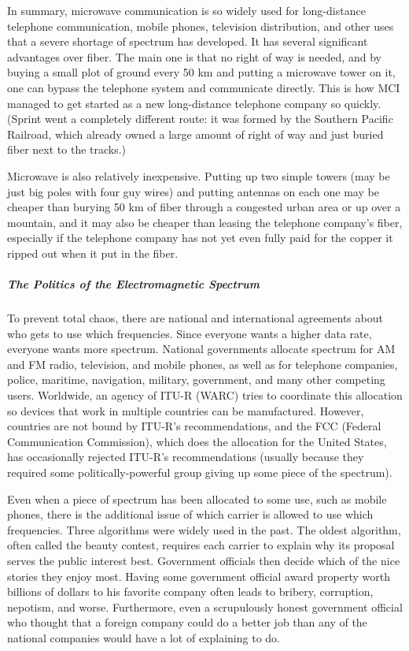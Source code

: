 \documentclass[b5paper,11pt]{memoir}
\begin{document}
In summary, microwave communication is so widely used for long-distance
telephone communication, mobile phones, television distribution, and
other uses that a severe shortage of spectrum has developed. It has
several significant advantages over fiber. The main one is that no right
of way is needed, and by buying a small plot of ground every 50 km and
putting a microwave tower on it, one can bypass the telephone system and
communicate directly. This is how MCI managed to get started as a new
long-distance telephone company so quickly. (Sprint went a completely
different route: it was formed by the Southern Pacific Railroad, which
already owned a large amount of right of way and just buried fiber next
to the tracks.)

Microwave is also relatively inexpensive. Putting up two simple towers
(may be just big poles with four guy wires) and putting antennas on each
one may be cheaper than burying 50 km of fiber through a congested urban
area or up over a mountain, and it may also be cheaper than leasing the
telephone company's fiber, especially if the telephone company has not
yet even fully paid for the copper it ripped out when it put in the
fiber.

\protect\hypertarget{0130661023_ch02lev1sec3.htmlux5cux23ch02lev3sec5}{}{}

\subparagraph{The Politics of the Electromagnetic Spectrum}

To prevent total chaos, there are national and international agreements
about who gets to use which frequencies. Since everyone wants a higher
data rate, everyone wants more spectrum. National governments allocate
spectrum for AM and FM radio, television, and mobile phones, as well as
for telephone companies, police, maritime, navigation, military,
government, and many other competing users. Worldwide, an agency of
ITU-R (WARC) tries to coordinate this allocation so devices that work in
multiple countries can be manufactured. However, countries are not bound
by ITU-R's recommendations, and the FCC (Federal Communication
Commission), which does the allocation for the United States, has
occasionally rejected ITU-R's recommendations (usually because they
required some politically-powerful group giving up some piece of the
spectrum).

Even when a piece of spectrum has been allocated to some use, such as
mobile phones, there is the additional issue of which carrier is allowed
to use which frequencies. Three algorithms were widely used in the past.
The oldest algorithm, often called the {beauty contest}, requires each
carrier to explain why its proposal serves the public interest best.
Government officials then decide which of the nice stories they enjoy
most. Having some government official award property worth billions of
dollars to his favorite company often leads to bribery, corruption,
nepotism, and worse. Furthermore, even a scrupulously honest government
official who thought that a foreign company could do a better job than
any of the national companies would have a lot of explaining to do.
\end{document}
